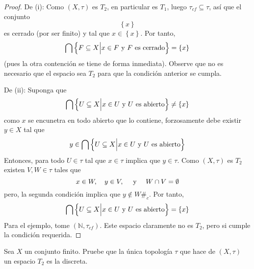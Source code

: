 \documentclass[12pt]{report}
\theoremstyle{largebreak}
\newcommand\contradiction{\ensuremath{\#_c}}
\begin{document}
    \begin{proof}
        De (i): Como $(X,\tau)$ es $T_2$, en particular es $T_1$, luego $\tau_{cf}\subseteq\tau$, así que el conjunto
        \begin{equation*}
            \left\{x\right\}
        \end{equation*}
        es cerrado (por ser finito) y tal que $x\in\left\{x\right\}$. Por tanto,
        \begin{equation*}
            \bigcap\left\{F\subseteq X\Big|x\in F\textup{ y }F\textup{ es cerrado} \right\}=\left\{x\right\}
        \end{equation*}
        (pues la otra contención se tiene de forma inmediata). Observe que no es necesario que el espacio sea $T_2$ para que la condición anterior se cumpla.

        De (ii): Suponga que
        \begin{equation*}
            \bigcap\left\{U\subseteq X\Big|x\in U\textup{ y }U\textup{ es abierto} \right\}\neq\left\{x\right\}
        \end{equation*}
        como $x$ se encunetra en todo abierto que lo contiene, forzosamente debe existir $y\in X$ tal que
        \begin{equation*}
            y\in\bigcap\left\{U\subseteq X\Big|x\in U\textup{ y }U\textup{ es abierto} \right\}
        \end{equation*}
        Entonces, para todo $U\in\tau$ tal que $x\in\tau$ implica que $y\in\tau$. Como $(X,\tau)$ es $T_2$ existen $V,W\in\tau$ tales que
        \begin{equation*}
            x\in W,\quad y\in V,\quad\textup{ y }\quad W\cap V=\emptyset
        \end{equation*}
        pero, la segunda condición implica que $y\notin W$\contradiction. Por tanto,
        \begin{equation*}
            \bigcap\left\{U\subseteq X\Big|x\in U\textup{ y }U\textup{ es abierto} \right\}=\left\{x\right\}
        \end{equation*}
        Para el ejemplo, tome $(\mathbb{N},\tau_{cf})$. Este espacio claramente no es $T_2$, pero si cumple la condición requerida.
    \end{proof}

    \begin{excer}
        Sea $X$ un conjunto finito. Pruebe que la única topología $\tau$ que hace de $(X,\tau)$ un espacio $T_2$ es la discreta. 
    \end{excer}
\end{document}
